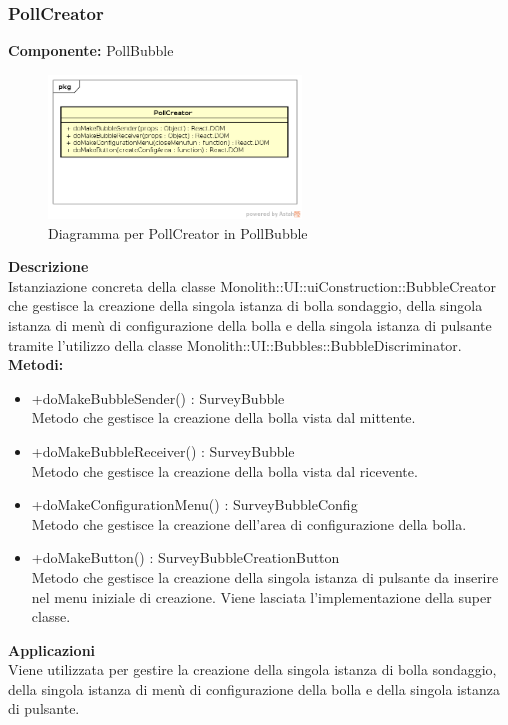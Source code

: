 \subsubsection{PollCreator}
\textbf{Componente:}  PollBubble\\
   \FloatBarrier
   \begin{figure}[ht]
   \centering
   \includegraphics[width=0.6\textwidth]{img/single-PollCreator.png}
   \caption{{Diagramma per PollCreator in PollBubble}}
\end{figure}
\FloatBarrier
\textbf{Descrizione}\\
Istanziazione concreta della classe Monolith::UI::uiConstruction::BubbleCreator che gestisce la creazione della singola istanza di bolla sondaggio, della singola istanza di menù di configurazione della bolla e della singola istanza di pulsante tramite l'utilizzo della classe Monolith::UI::Bubbles::BubbleDiscriminator.
\\
\textbf{Metodi:} 
\begin{itemize}
\item +doMakeBubbleSender() : SurveyBubble 
\\
Metodo che gestisce la creazione della bolla vista dal mittente.
\item +doMakeBubbleReceiver() : SurveyBubble 
\\
Metodo che gestisce la creazione della bolla vista dal ricevente.
\item +doMakeConfigurationMenu() : SurveyBubbleConfig 
\\
Metodo che gestisce la creazione dell'area di configurazione della bolla.
\item +doMakeButton() : SurveyBubbleCreationButton 
\\
Metodo che gestisce la creazione della singola istanza di pulsante da inserire nel menu iniziale di creazione. Viene lasciata l'implementazione della super classe.
\end{itemize} 


\textbf{Applicazioni}\\
Viene utilizzata per gestire la creazione della singola istanza di bolla sondaggio, della singola istanza di menù di configurazione della bolla e della singola istanza di pulsante. 


